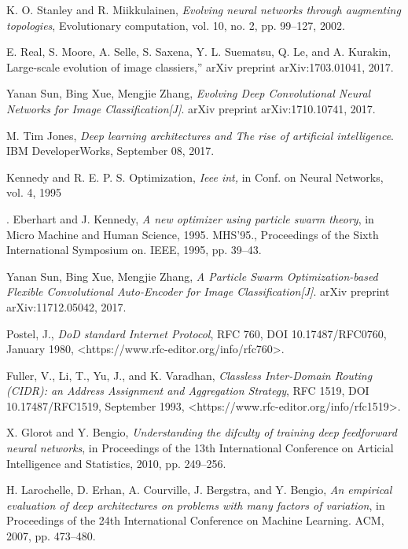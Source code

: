 \documentclass[conference]{IEEEtran}
\begin{document}
\begin{thebibliography}{}
K. O. Stanley and R. Miikkulainen, \emph{Evolving neural networks through augmenting topologies}, Evolutionary computation, vol. 10, no. 2, pp. 99–127, 2002.

E. Real, S. Moore, A. Selle, S. Saxena, Y. L. Suematsu, Q. Le, and A. Kurakin, Large-scale evolution of image classiers,” arXiv preprint arXiv:1703.01041, 2017.

Yanan Sun, Bing Xue, Mengjie Zhang, \emph{Evolving Deep Convolutional Neural Networks for Image Classification[J]}. arXiv preprint arXiv:1710.10741, 2017.

M. Tim Jones, \emph{Deep learning architectures and The rise of artificial intelligence}. IBM DeveloperWorks, September 08, 2017.

Kennedy and R. E. P. S. Optimization, \emph{Ieee int,} in Conf. on Neural Networks, vol. 4, 1995

. Eberhart and J. Kennedy, \emph{A new optimizer using particle swarm theory}, in Micro Machine and Human Science, 1995. MHS’95., Proceedings of the Sixth International Symposium on.  IEEE, 1995, pp. 39–43.

Yanan Sun, Bing Xue, Mengjie Zhang, \emph{A Particle Swarm Optimization-based Flexible Convolutional Auto-Encoder for Image Classification[J]}. arXiv preprint arXiv:11712.05042, 2017.

Postel, J., \emph{DoD standard Internet Protocol}, RFC 760, DOI 10.17487/RFC0760, January 1980, <https://www.rfc-editor.org/info/rfc760>.

Fuller, V., Li, T., Yu, J., and K. Varadhan, \emph{Classless Inter-Domain Routing (CIDR): an Address Assignment and Aggregation Strategy}, RFC 1519, DOI 10.17487/RFC1519, September 1993, <https://www.rfc-editor.org/info/rfc1519>.

X. Glorot and Y. Bengio, \emph{Understanding the difculty of training deep feedforward neural networks}, in Proceedings of the 13th International Conference on Articial Intelligence and Statistics, 2010, pp. 249–256.

H. Larochelle, D. Erhan, A. Courville, J. Bergstra, and Y. Bengio, \emph{An empirical evaluation of deep architectures on problems with many factors of variation}, in Proceedings of the 24th International Conference on Machine Learning. ACM, 2007, pp. 473–480.


\end{thebibliography}
\end{document}
